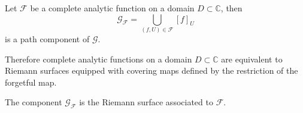 \begin{corollary}
    Let $\mathcal F$ be a complete analytic function on a domain $D\subset\mathbb C$, then
    $$\mathcal G_{\mathcal F}=\bigcup_{(f,U)\in\mathcal F}[f]_U$$
    is a path component of $\mathcal G$.
\end{corollary}
Therefore complete analytic functions on a domain $D\subset\mathbb C$ are equivalent to Riemann surfaces equipped with covering maps defined by the restriction of the forgetful map.
\begin{definition}
    The component $\mathcal G_{\mathcal F}$ is the Riemann surface associated to $\mathcal F$.
\end{definition}